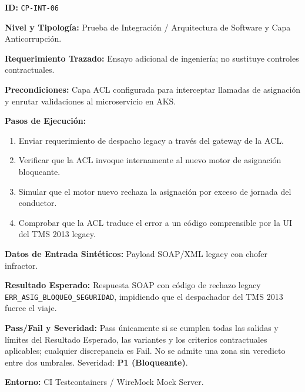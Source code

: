 \par\noindent\textbf{ID:} \texttt{C\allowbreak{}P\allowbreak{}-\allowbreak{}I\allowbreak{}N\allowbreak{}T\allowbreak{}-\allowbreak{}0\allowbreak{}6\allowbreak{}}\par
\par\noindent\textbf{Nivel y Tipología:} Prueba de Integración / Arquitectura de Software y Capa Anticorrupción.\par
\par\noindent\textbf{Requerimiento Trazado:} Ensayo adicional de ingeniería; no sustituye controles contractuales.\par
\par\noindent\textbf{Precondiciones:} Capa ACL configurada para interceptar llamadas de asignación y enrutar validaciones al microservicio en AKS.\par
\par\noindent\textbf{Pasos de Ejecución:} \par
\begin{enumerate}
\item Enviar requerimiento de despacho legacy a través del gateway de la ACL.
\item Verificar que la ACL invoque internamente al nuevo motor de asignación bloqueante.
\item Simular que el motor nuevo rechaza la asignación por exceso de jornada del conductor.
\item Comprobar que la ACL traduce el error a un código comprensible por la UI del TMS 2013 legacy.
\end{enumerate}
\par\noindent\textbf{Datos de Entrada Sintéticos:} Payload SOAP/XML legacy con chofer infractor.\par
\par\noindent\textbf{Resultado Esperado:} Respuesta SOAP con código de rechazo legacy \texttt{E\allowbreak{}R\allowbreak{}R\allowbreak{}\_\allowbreak{}A\allowbreak{}S\allowbreak{}I\allowbreak{}G\allowbreak{}\_\allowbreak{}B\allowbreak{}L\allowbreak{}O\allowbreak{}Q\allowbreak{}U\allowbreak{}E\allowbreak{}O\allowbreak{}\_\allowbreak{}S\allowbreak{}E\allowbreak{}G\allowbreak{}U\allowbreak{}R\allowbreak{}I\allowbreak{}D\allowbreak{}A\allowbreak{}D\allowbreak{}}, impidiendo que el despachador del TMS 2013 fuerce el viaje.\par
\par\noindent\textbf{Pass/Fail y Severidad:} Pass únicamente si se cumplen todas las salidas y límites del Resultado Esperado, las variantes y los criterios contractuales aplicables; cualquier discrepancia es Fail. No se admite una zona sin veredicto entre dos umbrales. Severidad: \textbf{P1 (Bloqueante)}.\par
\par\noindent\textbf{Entorno:} CI Testcontainers / WireMock Mock Server.\par






